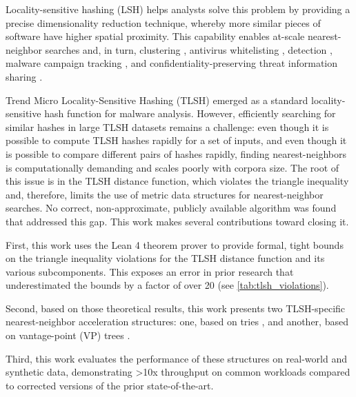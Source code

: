 \documentclass[5p,final]{elsarticle}
\begin{document}
Locality-sensitive hashing (LSH)
\cite{indykApproximateNearestNeighbors1998,haqSurveyBinaryCode2021}
helps analysts solve this problem by providing a precise
\cite{oliverTLSHLocalitySensitive2013} dimensionality
reduction technique, whereby more similar pieces of software have
higher spatial proximity. This capability enables at-scale
nearest-neighbor searches and, in turn, clustering
\cite{oliverFastClusteringHigh2021, bakClusteringIoTMalware2020},
antivirus whitelisting \cite{SmartWhitelistingUsing2017},
detection
\cite{intelligenceCombingFuzzUsing2021,naikRansomwareDetectionMethod2019},
malware campaign tracking \cite{naikCyberthreatHuntingPart2019}, and
confidentiality-preserving threat information sharing
\cite{almahmoudHashCombHierarchicalDistancePreserving2022}.

Trend Micro Locality-Sensitive Hashing
\cite{oliverTLSHLocalitySensitive2013,oliverGitHubTrendmicroTlsh2024} (TLSH)
emerged as a standard locality-sensitive hash function for
malware analysis. However, efficiently searching for similar hashes
in large TLSH datasets remains a challenge: even though it is possible
to compute TLSH hashes rapidly for a set of inputs, and even though
it is possible to compare different pairs of hashes rapidly, finding
nearest-neighbors is computationally demanding and scales poorly with
corpora size. The root of this issue is in the TLSH distance
function, which violates the triangle inequality and, therefore,
limits the use of metric data structures for nearest-neighbor
searches. No correct, non-approximate, publicly available algorithm
was found that addressed this gap. This work makes several contributions
toward closing it.

First, this work uses the Lean 4 theorem prover
\cite{deMouraUllrich2021} to provide formal, tight bounds on the triangle
inequality violations for the TLSH distance function and its various
subcomponents. This exposes an error in prior research that underestimated the
bounds by a factor of over 20 (see \autoref{tab:tlsh_violations}).

Second, based on those theoretical results, this work presents two
TLSH-specific nearest-neighbor acceleration structures: one, based on
tries \cite{fredkinTrieMemory1960}, and another, based on
vantage-point (VP) trees
\cite{yianilosDataStructuresAlgorithms1993,uhlmannSatisfyingGeneralProximity1991}.

Third, this work evaluates the performance of these structures on real-world
and synthetic data, demonstrating >10x throughput on common workloads compared
to corrected versions of the prior state-of-the-art.
\end{document}
